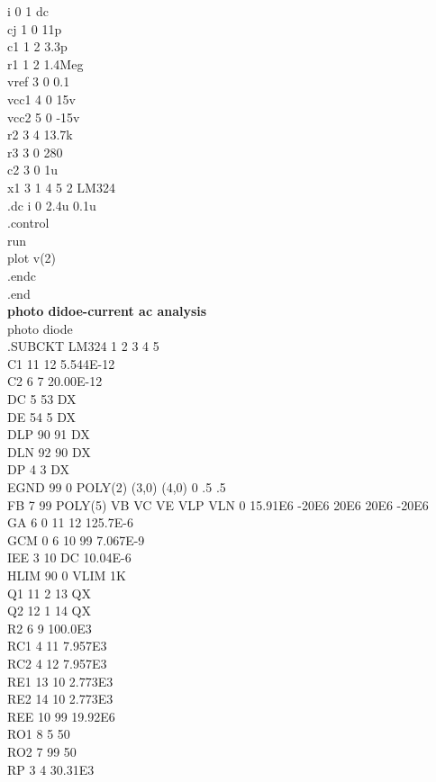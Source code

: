 \documentclass[12pt]{article}
\begin{document}
i 0 1 dc\\
cj 1 0 11p\\
c1 1 2 3.3p\\
r1 1 2 1.4Meg\\
vref 3 0 0.1\\
vcc1 4 0 15v\\
vcc2 5 0 -15v\\
r2 3 4 13.7k\\
r3 3 0 280\\
c2 3 0 1u\\
x1 3 1 4 5 2 LM324\\ 
.dc i 0 2.4u 0.1u\\
.control\\
run\\
plot v(2)\\ 
.endc\\
.end\\
\newpage
\textbf{photo didoe-current ac analysis\\}
photo diode\\
.SUBCKT LM324    1 2 3 4 5\\
C1   11 12 5.544E-12\\
C2    6  7 20.00E-12\\
DC    5 53 DX\\
DE   54  5 DX\\
DLP  90 91 DX\\
DLN  92 90 DX\\
DP    4  3 DX\\
EGND 99  0 POLY(2) (3,0) (4,0) 0 .5 .5\\
FB    7 99 POLY(5) VB VC VE VLP VLN 0 15.91E6 -20E6 20E6 20E6 -20E6\\
GA    6  0 11 12 125.7E-6\\
GCM   0  6 10 99 7.067E-9\\
IEE   3 10 DC 10.04E-6\\
HLIM 90  0 VLIM 1K\\
Q1   11  2 13 QX\\
Q2   12  1 14 QX\\
R2    6  9 100.0E3\\
RC1   4 11 7.957E3\\
RC2   4 12 7.957E3\\
RE1  13 10 2.773E3\\
RE2  14 10 2.773E3\\
REE  10 99 19.92E6\\
RO1   8  5 50\\
RO2   7 99 50\\
RP    3  4 30.31E3\\
\end{document}
